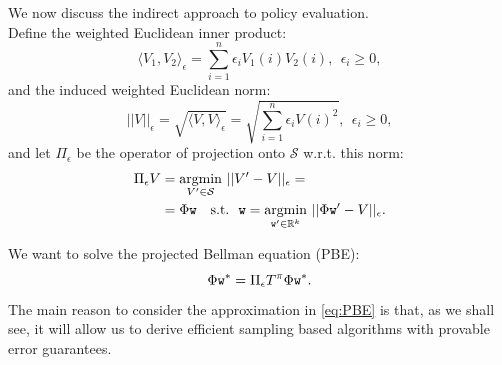 We now discuss the indirect approach to policy evaluation.
\\
Define the weighted Euclidean inner product:
$$\langle V_1,V_2\rangle_\epsilon = {\sum_{i=1}^n \epsilon_i V_1(i)V_2(i)}, \ \ \epsilon_i\ge0,$$
and the induced weighted Euclidean norm:
$$||V||_\epsilon = \sqrt{\langle V,V\rangle_\epsilon} = \sqrt{\sum_{i=1}^n \epsilon_i V(i)^2}, \ \ \epsilon_i\ge0,$$
and let $\Pi_\epsilon$ be the operator of projection onto $\mathcal{S}$ w.r.t. this norm:
\begin{align*}\Pi_\epsilon V &=\underset{V' \in \mathcal{S}}{\operatorname{argmin}} \ ||V'-V||_\epsilon =\\
&= \Phi \texttt{w} \ \ \ \mathrm{s.t.} \ \ \texttt{w} = \underset{\texttt{w}' \in \mathbb{R}^k}{\operatorname{argmin}} \ ||\Phi \texttt{w}' - V||_\epsilon.\end{align*}

We want to solve the projected Bellman equation (PBE):
\begin{equation}\label{eq:PBE}
\Phi \texttt{w}^*  = \Pi_\epsilon T^\pi \Phi \texttt{w}^*.
\end{equation}
The main reason to consider the approximation in \eqref{eq:PBE} is that, as we shall see, it will allow us to derive efficient sampling based algorithms with provable error guarantees.

